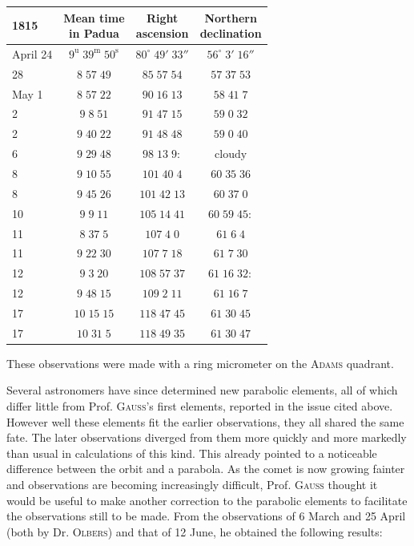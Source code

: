 \begin{center}\fontsize{10}{12}\selectfont\setlength{\tabcolsep}{5pt}\renewcommand{\arraystretch}{1.15}\begin{tabular}{l|c|c|c}
1815 & \shortstack{Mean time\\in Padua} & \shortstack{Right\\ascension} & \shortstack{Northern\\declination}\\\hline
April 24 & $9^{\mathrm u}\;39^{\mathrm m}\;50^{\mathrm s}$ & $80^\circ\;49'\;33''$ & $56^\circ\;3'\;16''$\\
28 & $8\;57\;49$ & $85\;57\;54$ & $57\;37\;53$\\
May 1 & $8\;57\;22$ & $90\;16\;13$ & $58\;41\;7$\\
2 & $9\;8\;51$ & $91\;47\;15$ & $59\;0\;32$\\
2 & $9\;40\;22$ & $91\;48\;48$ & $59\;0\;40$\\
6 & $9\;29\;48$ & $98\;13\;9:$ & $\text{cloudy}$\\
8 & $9\;10\;55$ & $101\;40\;4$ & $60\;35\;36$\\
8 & $9\;45\;26$ & $101\;42\;13$ & $60\;37\;0$\\
10 & $9\;9\;11$ & $105\;14\;41$ & $60\;59\;45:$\\
11 & $8\;37\;5$ & $107\;4\;0$ & $61\;6\;4$\\
11 & $9\;22\;30$ & $107\;7\;18$ & $61\;7\;30$\\
12 & $9\;3\;20$ & $108\;57\;37$ & $61\;16\;32:$\\
12 & $9\;48\;15$ & $109\;2\;11$ & $61\;16\;7$\\
17 & $10\;15\;15$ & $118\;47\;45$ & $61\;30\;45$\\
17 & $10\;31\;5$ & $118\;49\;35$ & $61\;30\;47$\\
\end{tabular}\end{center}

\par\indent These observations were made with a ring micrometer on the \textsc{Adams} quadrant.

\par\indent Several astronomers have since determined new parabolic elements, all of which differ little from Prof. \textsc{Gauss}’s first elements, reported in the issue cited above. However well these elements fit the earlier observations, they all shared the same fate. The later observations diverged from them more quickly and more markedly than usual in calculations of this kind. This already pointed to a noticeable difference between the orbit and a parabola. As the comet is now growing fainter and observations are becoming increasingly difficult, Prof. \textsc{Gauss} thought it would be useful to make another correction to the parabolic elements to facilitate the observations still to be made. From the observations of 6 March and 25 April (both by Dr. \textsc{Olbers}) and that of 12 June, he obtained the following results:

